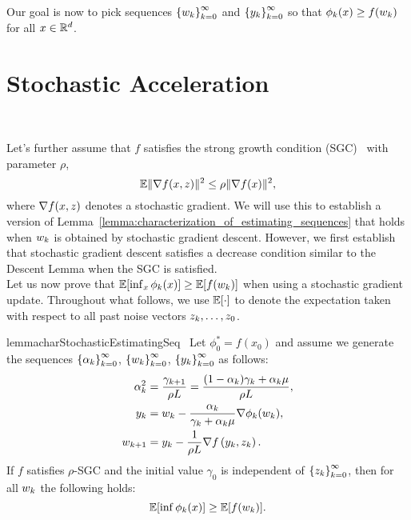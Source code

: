 Our goal is now to pick sequences \( \left\{w_k\right\}_{k=0}^\infty \) and \( \left\{y_k\right\}_{k=0}^\infty \) so that \( \phi_k(x) \geq f(w_k) \) for all \( x \in \mathbb{R}^d \).

\section{Stochastic Acceleration}~\label{sec:stochastic-acceleration}

Let's further assume that \( f \) satisfies the strong growth condition (SGC)~\citep{solodov1998incremental, tseng1998incremental, schmidt2013fast, vaswani2019fast} with parameter \( \rho \),
\[ \mathbb{E} \|\nabla f(x, z)\|^2 \leq \rho \|\nabla f(x)\|^2, \]
where \( \nabla f(x,z) \) denotes a stochastic gradient.
We will use this to establish a version of Lemma~\ref{lemma:characterization_of_estimating_sequences} that holds when \( w_k \) is obtained by stochastic gradient descent.
However, we first establish that stochastic gradient descent satisfies a decrease condition similar to the Descent Lemma when the SGC is satisfied.\\

Let us now prove that \( \mathbb{E}[\inf_x \phi_k(x)] \geq \mathbb{E}[f(w_k)] \) when using a stochastic gradient update.
Throughout what follows, we use \( \mathbb{E}[\cdot] \) to denote the expectation taken with respect to all past noise vectors \( z_{k}, \dots, z_0 \).\\

\begin{restatable}{lemma}{charStochasticEstimatingSeq}~\label{lemma:characterization_of_stochastic_estimating_sequences}
    Let \( \phi^*_0 = f(x_0) \) and assume we generate the sequences \( \left\{\alpha_k\right\}_{k=0}^\infty \), \( \left\{w_k\right\}_{k=0}^\infty \), \( \left\{y_k\right\}_{k=0}^\infty \) as follows:
    \begin{align*}
        \alpha^2_k &= \frac{\gamma_{k+1}}{\rho L } = \frac{(1-\alpha_k)\gamma_k + \alpha_k \mu}{\rho L}, \\
        y_k &= w_k - \frac{\alpha_k}{\gamma_k + \alpha_k \mu} \nabla \phi_k(w_k),\\
        w_{k+1} &= y_k - \frac{1}{\rho L} \nabla f\left(y_k, z_{k}\right).
    \end{align*}
    If \( f \) satisfies \( \rho \)-SGC and the initial value \( \gamma_0 \) is independent of \( \left\{z_{k}\right\}_{k=0}^\infty \), then for all \( w_k \) the following holds:
    \[ \mathbb{E} [\inf \phi_k(x)] \geq \mathbb{E} [f(w_k)]. \]
\end{restatable}


